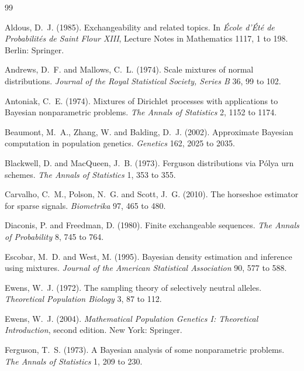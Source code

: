 \begin{thebibliography}{99}

Aldous, D.~J. (1985). Exchangeability and related topics. In \emph{\'Ecole d'\'Et\'e de
Probabilit\'es de Saint Flour XIII}, Lecture Notes in Mathematics 1117, 1 to 198. Berlin:
Springer.

Andrews, D.~F. and Mallows, C.~L. (1974). Scale mixtures of normal distributions.
\emph{Journal of the Royal Statistical Society, Series B} 36, 99 to 102.

Antoniak, C.~E. (1974). Mixtures of Dirichlet processes with applications to Bayesian
nonparametric problems. \emph{The Annals of Statistics} 2, 1152 to 1174.

Beaumont, M.~A., Zhang, W. and Balding, D.~J. (2002). Approximate Bayesian computation in
population genetics. \emph{Genetics} 162, 2025 to 2035.

Blackwell, D. and MacQueen, J.~B. (1973). Ferguson distributions via P\'olya urn schemes.
\emph{The Annals of Statistics} 1, 353 to 355.

Carvalho, C.~M., Polson, N.~G. and Scott, J.~G. (2010). The horseshoe estimator for sparse
signals. \emph{Biometrika} 97, 465 to 480.

Diaconis, P. and Freedman, D. (1980). Finite exchangeable sequences. \emph{The Annals of
Probability} 8, 745 to 764.

Escobar, M.~D. and West, M. (1995). Bayesian density estimation and inference using mixtures.
\emph{Journal of the American Statistical Association} 90, 577 to 588.

Ewens, W.~J. (1972). The sampling theory of selectively neutral alleles. \emph{Theoretical
Population Biology} 3, 87 to 112.

Ewens, W.~J. (2004). \emph{Mathematical Population Genetics I: Theoretical Introduction}, second
edition. New York: Springer.

Ferguson, T.~S. (1973). A Bayesian analysis of some nonparametric problems. \emph{The Annals of
Statistics} 1, 209 to 230.


\end{thebibliography}
